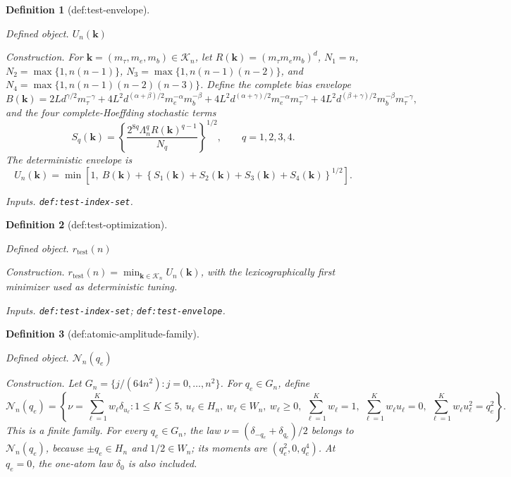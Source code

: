 \documentclass{article}
\newtheorem{definition}{Definition}
\begin{document}
\begin{definition}[def:test-envelope]\label{def:test-envelope}
\par\smallskip\noindent\emph{Defined object.} \(U_n(\mathbf k)\)
\par\smallskip\noindent\emph{Construction.} For \(\mathbf k=(m_\tau,m_e,m_b)\in\mathcal K_n\), let \(R(\mathbf k)=(m_\tau m_e m_b)^d\), \(N_1=n\), \(N_2=\max\{1,n(n-1)\}\), \(N_3=\max\{1,n(n-1)(n-2)\}\), and \(N_4=\max\{1,n(n-1)(n-2)(n-3)\}\). Define the complete bias envelope \[B(\mathbf k)=2Ld^{\gamma/2}m_\tau^{-\gamma}+4L^2d^{(\alpha+\beta)/2}m_e^{-\alpha}m_b^{-\beta}+4L^2d^{(\alpha+\gamma)/2}m_e^{-\alpha}m_\tau^{-\gamma}+4L^2d^{(\beta+\gamma)/2}m_b^{-\beta}m_\tau^{-\gamma},\] and the four complete-Hoeffding stochastic terms \[S_q(\mathbf k)=\left\{\frac{2^{8q}\Lambda_n^qR(\mathbf k)^{q-1}}{N_q}\right\}^{1/2},\qquad q=1,2,3,4.\] The deterministic envelope is \[U_n(\mathbf k)=\min\left[1,\ B(\mathbf k)+\left\{S_1(\mathbf k)+S_2(\mathbf k)+S_3(\mathbf k)+S_4(\mathbf k)\right\}^{1/2}\right].\]
\par\smallskip\noindent\emph{Inputs.} \texttt{def:\allowbreak{}test-\allowbreak{}index-\allowbreak{}set}.
\end{definition}

\begin{definition}[def:test-optimization]\label{def:test-optimization}
\par\smallskip\noindent\emph{Defined object.} \(r_{\mathrm{test}}(n)\)
\par\smallskip\noindent\emph{Construction.} \(r_{\mathrm{test}}(n)=\min_{\mathbf k\in\mathcal K_n}U_n(\mathbf k)\), with the lexicographically first minimizer used as deterministic tuning.
\par\smallskip\noindent\emph{Inputs.} \texttt{def:\allowbreak{}test-\allowbreak{}index-\allowbreak{}set}; \texttt{def:\allowbreak{}test-\allowbreak{}envelope}.
\end{definition}

\begin{definition}[def:atomic-amplitude-family]\label{def:atomic-amplitude-family}
\par\smallskip\noindent\emph{Defined object.} \(\mathcal N_n(q_e)\)
\par\smallskip\noindent\emph{Construction.} Let \(G_n=\{j/(64n^2):j=0,\ldots,n^2\}\). For \(q_e\in G_n\), define \[\mathcal N_n(q_e)=\left\{\nu=\sum_{\ell=1}^K w_\ell\delta_{u_\ell}:1\le K\le5,\ u_\ell\in H_n,\ w_\ell\in W_n,\ w_\ell\ge0,\ \sum_{\ell=1}^K w_\ell=1,\ \sum_{\ell=1}^K w_\ell u_\ell=0,\ \sum_{\ell=1}^K w_\ell u_\ell^2=q_e^2\right\}.\] This is a finite family. For every \(q_e\in G_n\), the law \(\nu=(\delta_{-q_e}+\delta_{q_e})/2\) belongs to \(\mathcal N_n(q_e)\), because \(\pm q_e\in H_n\) and \(1/2\in W_n\); its moments are \((q_e^2,0,q_e^4)\). At \(q_e=0\), the one-atom law \(\delta_0\) is also included.
\end{definition}
\end{document}
